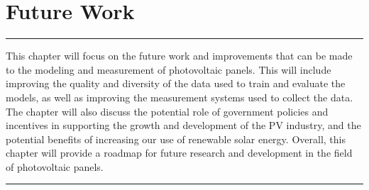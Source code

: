 \documentclass{report}
\begin{document}
\chapter{Future Work}
\noindent\rule{13cm}{1.2pt}\hfill \break
This chapter will focus on the future work and improvements that can be made to the modeling and measurement of photovoltaic panels. This will include improving the quality and diversity of the data used to train and evaluate the models, as well as improving the measurement systems used to collect the data. The chapter will also discuss the potential role of government policies and incentives in supporting the growth and development of the PV industry, and the potential benefits of increasing our use of renewable solar energy. Overall, this chapter will provide a roadmap for future research and development in the field of photovoltaic panels.
\hfill \break
\noindent\rule{13cm}{1.2pt}

\newpage
\hfill \break
\end{document}
